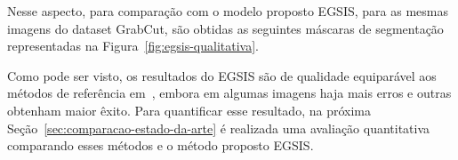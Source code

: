 
Nesse aspecto, para comparação com o modelo proposto \gls{EGSIS}, para
as mesmas imagens do dataset GrabCut, são obtidas as seguintes máscaras
de segmentação representadas na Figura~\ref{fig:egsis-qualitativa}.

\begin{figure}[h!]
        \captionsetup{width=14cm}
		\centering
        {}
\end{figure}
\FloatBarrier{}



Como pode ser visto, os resultados do \gls{EGSIS} são de qualidade
equiparável aos métodos de referência em~,
embora em algumas imagens haja mais erros e outras obtenham maior
êxito. Para quantificar esse resultado, na próxima
Seção~\ref{sec:comparacao-estado-da-arte} é realizada uma avaliação
quantitativa comparando esses métodos e o método proposto \gls{EGSIS}.


